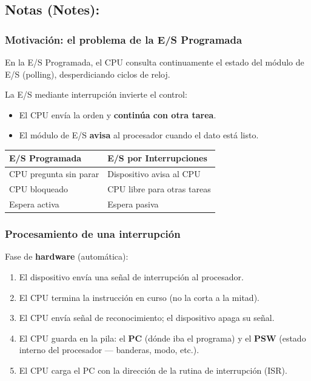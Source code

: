 \documentclass{article}
\begin{document}
\subsection{Notas (Notes):}
\label{sec:orge2f8e94}

\subsubsection{Motivación: el problema de la E/S Programada}
\label{sec:org2d2139d}
En la E/S Programada, el CPU consulta continuamente el estado del
módulo de E/S (polling), desperdiciando ciclos de reloj.

La E/S mediante interrupción invierte el control:
\begin{itemize}
\item El CPU envía la orden y \textbf{continúa con otra tarea}.
\item El módulo de E/S \textbf{avisa} al procesador cuando el dato está listo.
\end{itemize}

\begin{center}
\begin{tabular}{ll}
E/S Programada & E/S por Interrupciones\\[0pt]
\hline
CPU pregunta sin parar & Dispositivo avisa al CPU\\[0pt]
CPU bloqueado & CPU libre para otras tareas\\[0pt]
Espera activa & Espera pasiva\\[0pt]
\end{tabular}
\end{center}

\subsubsection{Procesamiento de una interrupción}
\label{sec:orgc3e6756}

Fase de \textbf{hardware} (automática):
\begin{enumerate}
\item El dispositivo envía una señal de interrupción al procesador.
\item El CPU termina la instrucción en curso (no la corta a la mitad).
\item El CPU envía señal de reconocimiento; el dispositivo apaga su señal.
\item El CPU guarda en la pila: el \textbf{PC} (dónde iba el programa) y el \textbf{PSW}
(estado interno del procesador — banderas, modo, etc.).
\item El CPU carga el PC con la dirección de la rutina de interrupción (ISR).
\end{enumerate}
\end{document}
